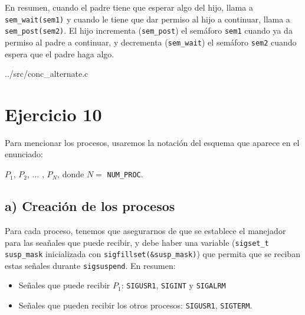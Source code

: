 \documentclass{article}
\begin{document}

En resumen, cuando el padre tiene que esperar algo del hijo, llama a \texttt{sem\_wait(sem1)} y cuando le tiene que dar permiso al hijo a continuar, llama a \texttt{sem\_post(sem2)}. El hijo incrementa (\texttt{sem\_post}) el semáforo \texttt{sem1} cuando ya da permiso al padre a continuar, y decrementa (\texttt{sem\_wait}) el semáforo \texttt{sem2} cuando espera que el padre haga algo.

\begin {tcolorbox}[colback=green!5!white]

{../src/conc_alternate.c}
\end{tcolorbox}


\pagebreak

\section*{Ejercicio 10}

Para mencionar los procesos, usaremos la notación del esquema que aparece en el enunciado: 

\noindent$P_1$, $P_2$, $\dots$ , $P_N$, donde $N =$ \texttt{NUM\_PROC}.

\subsection*{a) Creación de los procesos} 

Para cada proceso, tenemos que asegurarnos de que se establece el manejador para las seañales que puede recibir, y debe haber una variable (\texttt{sigset\_t susp\_mask} inicializada con \texttt{sigfillset(\&susp\_mask)}) que permita que se reciban estas señales durante \texttt{sigsuspend}. En resumen:

\begin{itemize}
    \item Señales que puede recibir $P_1$: \texttt{SIGUSR1}, \texttt{SIGINT} y \texttt{SIGALRM}
    \item Señales que pueden recibir los otros procesos: \texttt{SIGUSR1}, \texttt{SIGTERM}.
\end{itemize}
\end{document}

